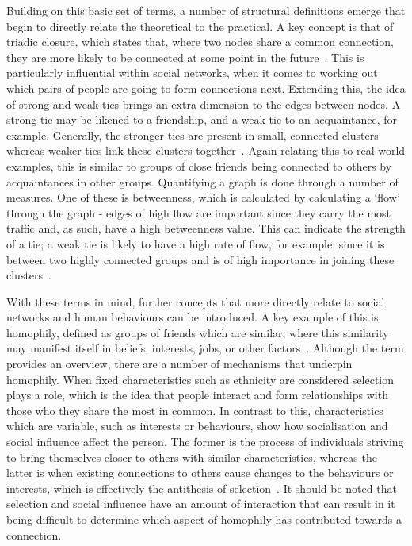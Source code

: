 \documentclass[]{report}
\begin{document}
Building on this basic set of terms, a number of structural definitions emerge that begin to directly relate the theoretical to the practical. A key concept is that of triadic closure, which states that, where two nodes share a common connection, they are more likely to be connected at some point in the future~\cite{NetMark-44}. This is particularly influential within social networks, when it comes to working out which pairs of people are going to form connections next. Extending this, the idea of strong and weak ties brings an extra dimension to the edges between nodes. A strong tie may be likened to a friendship, and a weak tie to an acquaintance, for example. Generally, the stronger ties are present in small, connected clusters whereas weaker ties link these clusters together~\cite{NetMark-46}. Again relating this to real-world examples, this is similar to groups of close friends being connected to others by acquaintances in other groups. Quantifying a graph is done through a number of measures. One of these is betweenness, which is calculated by calculating a `flow' through the graph - edges of high flow are important since they carry the most traffic and, as such, have a high betweenness value. This can indicate the strength of a tie; a weak tie is likely to have a high rate of flow, for example, since it is between two highly connected groups and is of high importance in joining these clusters~\cite{NetMark-66}.  

With these terms in mind, further concepts that more directly relate to social networks and human behaviours can be introduced. A key example of this is homophily, defined as groups of friends which are similar, where this similarity may manifest itself in beliefs, interests, jobs, or other factors~\cite{USN-18}. Although the term provides an overview, there are a number of mechanisms that underpin homophily. When fixed characteristics such as ethnicity are considered selection plays a role, which is the idea that people interact and form relationships with those who they share the most in common. In contrast to this, characteristics which are variable, such as interests or behaviours, show how socialisation and social influence affect the person. The former is the process of individuals striving to bring themselves closer to others with similar characteristics, whereas the latter is when existing connections to others cause changes to the behaviours or interests, which is effectively the antithesis of selection~\cite{NetMark-81}. It should be noted that selection and social influence have an amount of interaction that can result in it being difficult to determine which aspect of homophily has contributed towards a connection.
\end{document}
